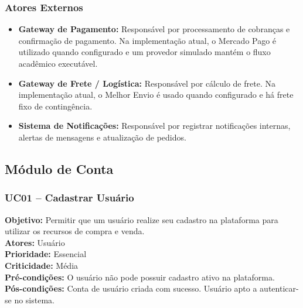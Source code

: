 \documentclass[
	article,			%
	11pt,				%
	oneside,			%
	a4paper,			%
	english,			%
	brazil,				%
	sumario=tradicional
	]{abntex2}
\begin{document}
\subsubsection{Atores Externos}
\begin{itemize}
    \item \textbf{Gateway de Pagamento:} Responsável por processamento de cobranças e confirmação de pagamento. Na implementação atual, o Mercado Pago é utilizado quando configurado e um provedor simulado mantém o fluxo acadêmico executável.
    \item \textbf{Gateway de Frete / Logística:} Responsável por cálculo de frete. Na implementação atual, o Melhor Envio é usado quando configurado e há frete fixo de contingência.
    \item \textbf{Sistema de Notificações:} Responsável por registrar notificações internas, alertas de mensagens e atualização de pedidos.
\end{itemize}

\subsection{Módulo de Conta}

\subsubsection{UC01 – Cadastrar Usuário}
\label{uc:01}
\noindent\textbf{Objetivo:} Permitir que um usuário realize seu cadastro na plataforma para utilizar os recursos de compra e venda.\\
\textbf{Atores:} Usuário\\
\textbf{Prioridade:} Essencial\\
\textbf{Criticidade:} Média\\
\textbf{Pré-condições:} O usuário não pode possuir cadastro ativo na plataforma.\\
\textbf{Pós-condições:} Conta de usuário criada com sucesso. Usuário apto a autenticar-se no sistema.
\end{document}

